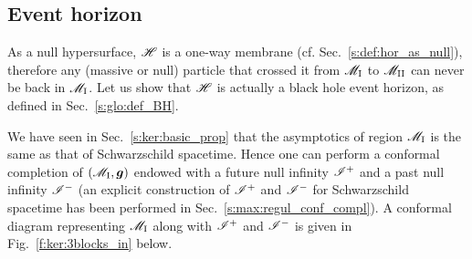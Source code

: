 \subsection{Event horizon} \label{s:ker:event_hor}

As a null hypersurface, $\mathscr{H}$ is a one-way membrane (cf. Sec.~\ref{s:def:hor_as_null}),
therefore any (massive or null) particle that crossed it from $\mathscr{M}_{\rm I}$ to
$\mathscr{M}_{\rm II}$ can never be back in $\mathscr{M}_{\rm I}$. Let us show that $\mathscr{H}$
is actually a black hole event horizon, as defined in Sec.~\ref{s:glo:def_BH}.

We have seen in Sec.~\ref{s:ker:basic_prop} that the asymptotics of region $\mathscr{M}_{\rm I}$
is the same as that of Schwarzschild spacetime. Hence one can perform a conformal
completion of $(\mathscr{M}_{\rm I},\bm{g})$ endowed with a future null infinity $\mathscr{I}^+$
and a past null infinity $\mathscr{I}^-$ (an explicit construction of $\mathscr{I}^+$ and
$\mathscr{I}^-$ for Schwarzschild spacetime has been performed in
Sec.~\ref{s:max:regul_conf_compl}). A conformal diagram representing $\mathscr{M}_{\rm I}$
along with $\mathscr{I}^+$
and $\mathscr{I}^-$ is given in Fig.~\ref{f:ker:3blocks_in} below.


